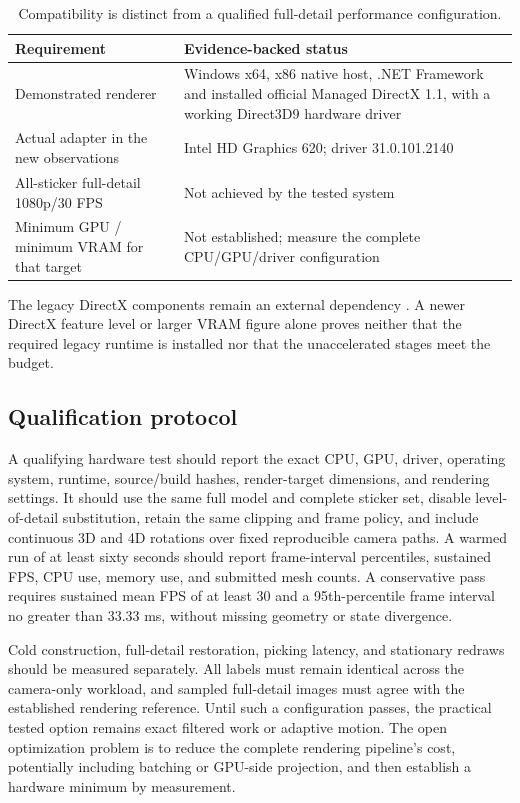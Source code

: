 \documentclass[a4paper,11pt]{article}
\begin{document}
\begin{table}[htbp]
\centering\small
\caption{Compatibility is distinct from a qualified full-detail performance configuration.}
\label{tab:hardware}
\begin{tabularx}{\linewidth}{@{}>{\raggedright\arraybackslash}p{.32\linewidth}X@{}}
\toprule
\textbf{Requirement} & \textbf{Evidence-backed status}\\
\midrule
Demonstrated renderer & Windows x64, x86 native host, .NET Framework and installed official Managed DirectX 1.1, with a working Direct3D9 hardware driver\\
Actual adapter in the new observations & Intel HD Graphics 620; driver 31.0.101.2140\\
All-sticker full-detail 1080p/30 FPS & Not achieved by the tested system\\
Minimum GPU / minimum VRAM for that target & Not established; measure the complete CPU/GPU/driver configuration\\
\bottomrule
\end{tabularx}
\end{table}

The legacy DirectX components remain an external dependency \cite{directx}. A newer DirectX feature level or larger VRAM figure alone proves neither that the required legacy runtime is installed nor that the unaccelerated stages meet the budget.

\subsection{Qualification protocol}

A qualifying hardware test should report the exact CPU, GPU, driver, operating system, runtime, source/build hashes, render-target dimensions, and rendering settings. It should use the same full model and complete sticker set, disable level-of-detail substitution, retain the same clipping and frame policy, and include continuous 3D and 4D rotations over fixed reproducible camera paths. A warmed run of at least sixty seconds should report frame-interval percentiles, sustained FPS, CPU use, memory use, and submitted mesh counts. A conservative pass requires sustained mean FPS of at least 30 and a 95th-percentile frame interval no greater than 33.33 ms, without missing geometry or state divergence.

Cold construction, full-detail restoration, picking latency, and stationary redraws should be measured separately. All labels must remain identical across the camera-only workload, and sampled full-detail images must agree with the established rendering reference. Until such a configuration passes, the practical tested option remains exact filtered work or adaptive motion. The open optimization problem is to reduce the complete rendering pipeline's cost, potentially including batching or GPU-side projection, and then establish a hardware minimum by measurement.
\end{document}
